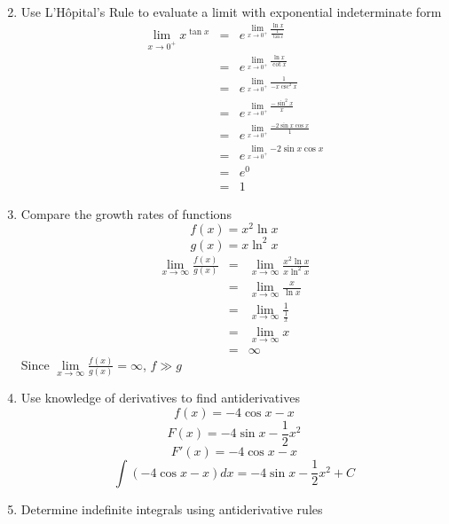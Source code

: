 \documentclass{article}
\begin{document}
\begin{enumerate}
\begin{eqnarray}
        \end{eqnarray}
    \item Use L'Hôpital's Rule to evaluate a limit with exponential indeterminate form
        \begin{eqnarray}
            \lim_{x \to 0^+}{x^{\tan{x}}} &=& e^{\lim\limits_{x \to 0^+}{\frac{\ln{x}}{\frac{1}{\tan{x}}}}} \\
                                          &=& e^{\lim\limits_{x \to 0^+}{\frac{\ln{x}}{\cot{x}}}} \\
                                          &=& e^{\lim\limits_{x \to 0^+}{\frac{1}{-x\csc^2{x}}}} \\
                                          &=& e^{\lim\limits_{x \to 0^+}{\frac{-\sin^2{x}}{x}}} \\
                                          &=& e^{\lim\limits_{x \to 0^+}{\frac{-2\sin{x}\cos{x}}{1}}} \\
                                          &=& e^{\lim\limits_{x \to 0^+}{-2\sin{x}\cos{x}}} \\
                                          &=& e^0 \\
                                          &=& 1
        \end{eqnarray}
    \item Compare the growth rates of functions
        $$f(x) = x^2\ln{x}$$
        $$g(x) = x\ln^2{x}$$
        \begin{eqnarray}
            \lim_{x \to \infty}{\frac{f(x)}{g(x)}} &=& \lim_{x \to \infty}{\frac{x^2\ln{x}}{x\ln^2{x}}} \\
                                                   &=& \lim_{x \to \infty}{\frac{x}{\ln{x}}} \\
                                                   &=& \lim_{x \to \infty}{\frac{1}{\frac{1}{x}}} \\
                                                   &=& \lim_{x \to \infty}{x} \\
                                                   &=& \infty
        \end{eqnarray}
        Since $\lim\limits_{x \to \infty}{\frac{f(x)}{g(x)}} = \infty$, $f \gg g$
        \item Use knowledge of derivatives to find antiderivatives
            $$f(x) = -4\cos{x} - x$$
            $$F(x) = -4\sin{x} - \frac{1}{2}x^2$$
            $$F'(x) = -4\cos{x} - x$$
            $$\int{\left(-4\cos{x} - x\right)} dx = -4\sin{x} - \frac{1}{2}x^2 + C$$
        \item Determine indefinite integrals using antiderivative rules

\end{enumerate}
\end{document}
